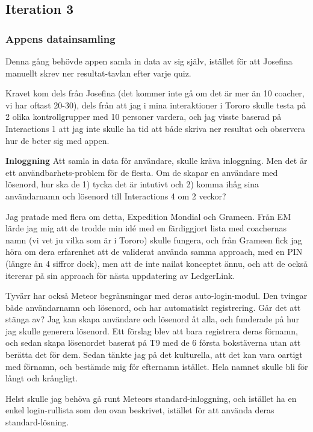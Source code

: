 \subsection{Iteration 3}

\subsubsection{Appens datainsamling}
Denna gång behövde appen samla in data av sig själv, istället för att Josefina manuellt skrev ner resultat-tavlan efter varje quiz.

Kravet kom dels från Josefina (det kommer inte gå om det är mer än 10 coacher, vi har oftast 20-30), dels från att jag i mina interaktioner i Tororo skulle testa på 2 olika kontrollgrupper med 10 personer vardera, och jag visste baserad på Interactions 1 att jag inte skulle ha tid att både skriva ner resultat och observera hur de beter sig med appen.

\textbf{Inloggning}
Att samla in data för användare, skulle kräva inloggning. Men det är ett användbarhets-problem för de flesta. Om de skapar en användare med lösenord, hur ska de 1) tycka det är intutivt och 2) komma ihåg sina användarnamn och lösenord till Interactions 4 om 2 veckor?

Jag pratade med flera om detta, Expedition Mondial och Grameen. Från EM lärde jag mig att de trodde min idé med en färdiggjort lista med coachernas namn (vi vet ju vilka som är i Tororo) skulle fungera, och från Grameen fick jag höra om dera erfarenhet att de validerat använda samma approach, med en PIN (längre än 4 siffror dock), men att de inte nailat konceptet ännu, och att de också itererar på sin approach för nästa uppdatering av LedgerLink.

Tyvärr har också Meteor begränsningar med deras auto-login-modul. Den tvingar både användarnamn och lösenord, och har automatiskt registrering. Går det att stänga av? Jag kan skapa användare och lösenord åt alla, och funderade på hur jag skulle generera lösenord. Ett förslag blev att bara registrera deras förnamn, och sedan skapa lösenordet baserat på T9 med de 6 första bokstäverna utan att berätta det för dem. Sedan tänkte jag på det kulturella, att det kan vara oartigt med förnamn, och bestämde mig för efternamn istället. Hela namnet skulle bli för långt och krångligt.

Helst skulle jag behöva gå runt Meteors standard-inloggning, och istället ha en enkel login-rullista som den ovan beskrivet, istället för att använda deras standard-lösning.

